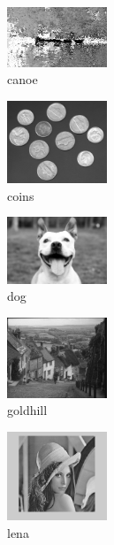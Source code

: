 \documentclass[conference]{IEEEtran}
\begin{document}
\begin{figure}[H]
    \centerline{\includegraphics[width=3cm]{picture/canoe.png}}
    \caption{canoe}
    \label{canoe}
\end{figure}

\begin{figure}[H]
    \centerline{\includegraphics[width=3cm]{picture/coins.png}}
    \caption{coins}
    \label{coins}
\end{figure}

\begin{figure}[H]
    \centerline{\includegraphics[width=3cm]{picture/dog.png}}
    \caption{dog}
    \label{dog}
\end{figure}

\begin{figure}[H]
    \centerline{\includegraphics[width=3cm]{picture/goldhill.png}}
    \caption{goldhill}
    \label{goldhill}
\end{figure}

\begin{figure}[H]
    \centerline{\includegraphics[width=3cm]{picture/lena.png}}
    \caption{lena}
    \label{lena}
\end{figure}
\end{document}
